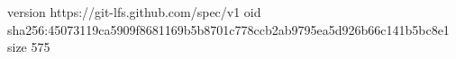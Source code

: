 version https://git-lfs.github.com/spec/v1
oid sha256:45073119ca5909f8681169b5b8701c778ccb2ab9795ea5d926b66c141b5bc8e1
size 575

